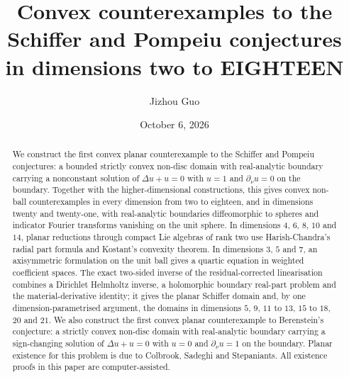 \documentclass[11pt]{amsart}
\newcommand{\topdim}{18}
\newcommand{\topdimword}{eighteen}
\theoremstyle{definition}
\theoremstyle{remark}
\numberwithin{equation}{section}
\begin{document}
\title[Convex Schiffer and Pompeiu counterexamples in dimensions 2--\topdim]{Convex counterexamples to the Schiffer and Pompeiu conjectures in dimensions two to \MakeUppercase{\topdimword}}

\author{Jizhou Guo}
\address{Dots Studio, Rednote}

\date{October 6, 2026}


\begin{abstract}
We construct the first convex planar counterexample to the Schiffer and Pompeiu conjectures: a bounded strictly convex non-disc domain with real-analytic boundary carrying a nonconstant solution of $\Delta u+u=0$ with $u=1$ and $\partial_\nu u=0$ on the boundary. Together with the higher-dimensional constructions, this gives convex non-ball counterexamples in every dimension from two to \topdimword, and in dimensions twenty and twenty-one, with real-analytic boundaries diffeomorphic to spheres and indicator Fourier transforms vanishing on the unit sphere. In dimensions $4$, $6$, $8$, $10$ and $14$, planar reductions through compact Lie algebras of rank two use Harish-Chandra's radial part formula and Kostant's convexity theorem. In dimensions $3$, $5$ and $7$, an axisymmetric formulation on the unit ball gives a quartic equation in weighted coefficient spaces. The exact two-sided inverse of the residual-corrected linearisation combines a Dirichlet Helmholtz inverse, a holomorphic boundary real-part problem and the material-derivative identity; it gives the planar Schiffer domain and, by one dimension-parametrised argument, the domains in dimensions $5$, $9$, $11$ to $13$, $15$ to $18$, $20$ and $21$. We also construct the first convex planar counterexample to Berenstein's conjecture: a strictly convex non-disc domain with real-analytic boundary carrying a sign-changing solution of $\Delta u+u=0$ with $u=0$ and $\partial_\nu u=1$ on the boundary. Planar existence for this problem is due to Colbrook, Sadeghi and Stepaniants. All existence proofs in this paper are computer-assisted.
\end{abstract}

\maketitle
\end{document}
